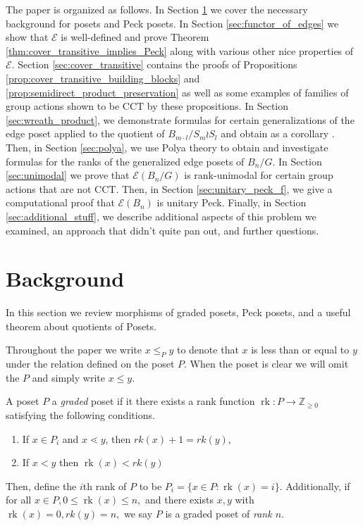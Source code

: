 \documentclass[10 pt]{amsart}
\theoremstyle{plain}
\theoremstyle{definition}
\theoremstyle{remark}
\numberwithin{equation}{section}
\newcommand\BZ{{\mathbb Z}}
\newcommand\rk{\operatorname{rk}}
\begin{document}
The paper is organized as follows. In Section \ref{sec:background} we cover the necessary background for posets and Peck posets.  In Section \ref{sec:functor_of_edges} we show that $\mathcal E$ is well-defined and prove Theorem \ref{thm:cover_transitive_implies_Peck} along with various other nice properties of $\mathcal E$. Section \ref{sec:cover_transitive} contains the proofs of Propositions \ref{prop:cover_transitive_building_blocks} and \ref{prop:semidirect_product_preservation} as well as some examples of families of group actions shown to be CCT by these propositions. In Section \ref{sec:wreath_product}, we demonstrate formulas for certain generalizations of the edge poset applied to the quotient of $B_{m \cdot l}/S_m \wr S_l$ and obtain as a corollary \cite[Theorem 1.1]{pak}. Then, in Section \ref{sec:polya}, we use Polya theory to obtain and investigate formulas for the ranks of the generalized edge posets of $B_n/G.$ In Section \ref{sec:unimodal} we prove that $\mathcal E(B_n/G)$ is rank-unimodal for certain group actions that are not CCT. Then, in Section \ref{sec:unitary_peck_f}, we give a computational proof that $\mathcal E(B_n)$ is unitary Peck. Finally, in Section \ref{sec:additional_stuff}, we describe additional aspects of this problem we examined, an approach that didn't quite pan out, and further questions.



\section{Background}\label{sec:background}
In this section we review morphisms of graded posets, Peck posets, and a useful theorem about quotients of Posets. 

Throughout the paper we write $x\le_P y$ to denote that $x$ is less than or equal to $y$ under the relation defined on the poset $P$. When the poset is clear we will omit the $P$ and simply write $x\le y$.

A poset $P$ a {\it graded} poset if it there exists a rank function $\rk:P \rightarrow \BZ_{\geq 0}$ satisfying the following conditions.
\begin{enumerate}
	\item If $x\in P_i$ and $x\lessdot y$, then $rk(x) + 1 = rk(y),$
	\item If $x < y$ then $\rk(x) < rk(y)$ 
\end{enumerate}
Then, define the $i$th rank of $P$ to be  $P_i = \{x \in P\colon\rk(x) = i\}.$ Additionally, if for all $x\in P,0 \leq \rk(x) \leq n,$ and there exists $x,y$ with $\rk(x) = 0, rk(y) = n,$ we say $P$ is a graded poset of {\it rank $n$}.
\end{document}
